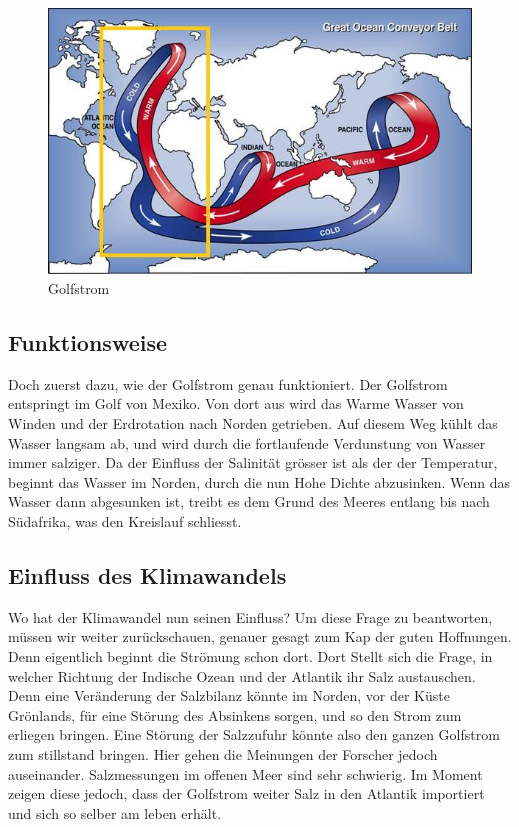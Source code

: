 \begin{figure}[H]
	\includegraphics[width=12cm]{thermohalin/bilder/Deep-Ocean-Currents.jpg}
	\centering
	\caption{Golfstrom}
\end{figure}



\subsection{Funktionsweise}

Doch zuerst dazu, wie der Golfstrom genau funktioniert.
Der Golfstrom entspringt im Golf von Mexiko. Von dort aus wird das Warme Wasser von Winden und der Erdrotation nach Norden getrieben.
Auf diesem Weg kühlt das Wasser langsam ab, und wird durch die fortlaufende Verdunstung von Wasser immer salziger. Da der Einfluss der Salinität grösser ist als der der Temperatur, beginnt das Wasser im Norden, durch die nun Hohe Dichte abzusinken. Wenn das Wasser dann abgesunken ist, treibt es dem Grund des Meeres entlang bis nach Südafrika, was den Kreislauf schliesst.

\subsection{Einfluss des Klimawandels} 
Wo hat der Klimawandel nun seinen Einfluss?
Um diese Frage zu beantworten, müssen wir weiter zurückschauen, genauer gesagt zum Kap der guten Hoffnungen. Denn eigentlich beginnt die Strömung schon dort. 
Dort Stellt sich die Frage, in welcher Richtung der Indische Ozean und der Atlantik ihr Salz austauschen. 
Denn eine Veränderung der Salzbilanz könnte im Norden, vor der Küste Grönlands, für eine Störung des Absinkens sorgen, und so den Strom zum erliegen bringen. 
Eine Störung der Salzzufuhr könnte also den ganzen Golfstrom zum stillstand bringen.
Hier gehen die Meinungen der Forscher jedoch auseinander. Salzmessungen im offenen Meer sind sehr schwierig. 
Im Moment zeigen diese jedoch, dass der Golfstrom weiter Salz in den Atlantik importiert und sich so selber am leben erhält.

